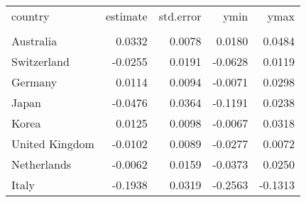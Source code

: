 \begin{tabular}{lrrrr}
   \toprule 
 
country & estimate & std.error & ymin & ymax \\ 

\cmidrule(lr){1-5} 
 
\\[-1.8ex]  
 
Australia & 0.0332 & 0.0078 & 0.0180 & 0.0484 \\ 
  Switzerland & -0.0255 & 0.0191 & -0.0628 & 0.0119 \\ 
  Germany & 0.0114 & 0.0094 & -0.0071 & 0.0298 \\ 
  Japan & -0.0476 & 0.0364 & -0.1191 & 0.0238 \\ 
  Korea & 0.0125 & 0.0098 & -0.0067 & 0.0318 \\ 
  United Kingdom & -0.0102 & 0.0089 & -0.0277 & 0.0072 \\ 
  Netherlands & -0.0062 & 0.0159 & -0.0373 & 0.0250 \\ 
  Italy & -0.1938 & 0.0319 & -0.2563 & -0.1313 \\ 
   \bottomrule  
\end{tabular}
